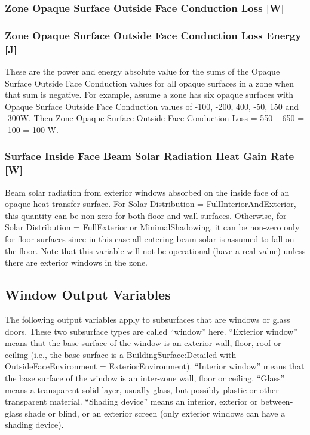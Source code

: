 \subsubsection{Zone Opaque Surface Outside Face Conduction Loss {[}W{]}}\label{zone-opaque-surface-outside-face-conduction-loss-w}

\subsubsection{Zone Opaque Surface Outside Face Conduction Loss Energy {[}J{]}}\label{zone-opaque-surface-outside-face-conduction-loss-energy-j}

These are the power and energy absolute value for the sums of the Opaque Surface Outside Face Conduction values for all opaque surfaces in a zone when that sum is negative. For example, assume a zone has six opaque surfaces with Opaque Surface Outside Face Conduction values of -100, -200, 400, -50, 150 and -300W. Then Zone Opaque Surface Outside Face Conduction Loss = \textbar{}550 -- 650\textbar{} = \textbar{}-100\textbar{} = 100 W.

\subsubsection{Surface Inside Face Beam Solar Radiation Heat Gain Rate {[}W{]}}\label{surface-inside-face-beam-solar-radiation-heat-gain-rate-w}

Beam solar radiation from exterior windows absorbed on the inside face of an opaque heat transfer surface. For Solar Distribution = FullInteriorAndExterior, this quantity can be non-zero for both floor and wall surfaces. Otherwise, for Solar Distribution = FullExterior or MinimalShadowing, it can be non-zero only for floor surfaces since in this case all entering beam solar is assumed to fall on the floor. Note that this variable will not be operational (have a real value) unless there are exterior windows in the zone.

\subsection{Window Output Variables}\label{window-output-variables-1}

The following output variables apply to subsurfaces that are windows or glass doors. These two subsurface types are called ``window'' here. ``Exterior window'' means that the base surface of the window is an exterior wall, floor, roof or ceiling (i.e., the base surface is a \hyperref[buildingsurfacedetailed]{BuildingSurface:Detailed} with OutsideFaceEnvironment = ExteriorEnvironment). ``Interior window'' means that the base surface of the window is an inter-zone wall, floor or ceiling. ``Glass'' means a transparent solid layer, usually glass, but possibly plastic or other transparent material. ``Shading device'' means an interior, exterior or between-glass shade or blind, or an exterior screen (only exterior windows can have a shading device).

